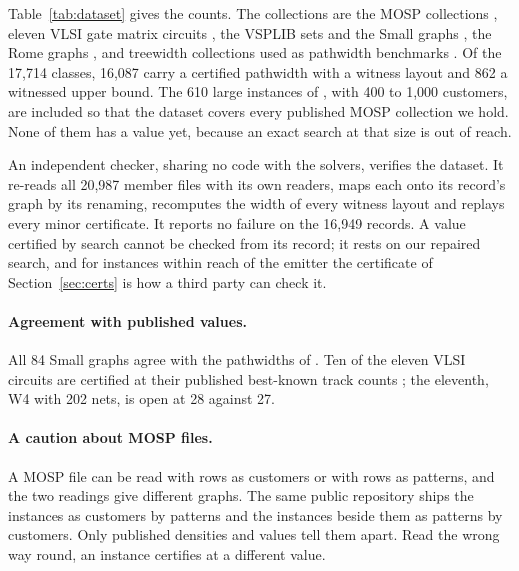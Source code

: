Table~\ref{tab:dataset} gives the counts. The collections are the MOSP
collections
\citep{SmithGent2005,FaggioliBentivoglio1998,ChuStuckey2009,CarvalhoSoma2015,Frinhani2018},
eleven VLSI gate matrix circuits \citep{OliveiraLorena2002}, the VSPLIB sets
\citep{Duarte2012} and the Small graphs \citep{MartiCamposPinana2008}, the Rome
graphs \citep{DiBattista1997}, and treewidth collections used as pathwidth
benchmarks \citep{TreewidthLIB,freetdi,PACE2016,PACE2017}. Of the 17,714
classes, 16,087 carry a certified pathwidth with a witness layout and 862 a
witnessed upper bound. The 610 large instances of \citet{Frinhani2018}, with
400 to 1,000 customers, are included so that the dataset covers every
published MOSP collection we hold. None of them has a value yet, because an
exact search at that size is out of reach.

An independent checker, sharing no code with the solvers, verifies the
dataset. It re-reads all 20,987 member files with its own readers, maps each
onto its record's graph by its renaming, recomputes the width of every witness
layout and replays every minor certificate. It reports no failure on the
16,949 records. A value certified by search cannot be checked from its record;
it rests on our repaired search, and for instances within reach of the emitter
the certificate of Section~\ref{sec:certs} is how a third party can check it.

\paragraph{Agreement with published values.} All 84 Small graphs agree with
the pathwidths of \citet[Tables~4--5]{Mallach2018}. Ten of the eleven VLSI
circuits are certified at their published best-known track counts
\citep[Table~I]{OliveiraLorena2002}; the eleventh, W4 with 202 nets, is open
at 28 against 27.

\paragraph{A caution about MOSP files.} A MOSP file can be read with rows as
customers or with rows as patterns, and the two readings give different
graphs. The same public repository ships the
\citet{CarvalhoSoma2015} instances as customers by patterns and the
\citet{ChuStuckey2009} instances beside them as patterns by customers. Only
published densities and values tell them apart. Read the wrong way round, an
instance certifies at a different value.
